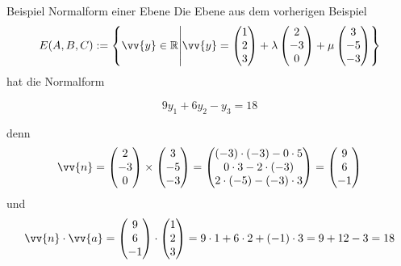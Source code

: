 \begin{frame}{Beispiel Normalform einer Ebene}
	Die Ebene aus dem vorherigen Beispiel
		\[
		E(A,B,C):= \left\{ \vv{y} \in \mathbb{R} \middle| \vv{y} = \begin{pmatrix}
		1\\2\\3
		\end{pmatrix} + \lambda \begin{pmatrix}
		2\\-3\\0
		\end{pmatrix} + \mu \begin{pmatrix}
		3\\-5\\-3
		\end{pmatrix} \right\}
		\]
	hat die Normalform	
	\begin{framed}
	\[
	9 y_1 + 6 y_2 - y_3 = 18
	\]
	\end{framed}
	{\footnotesize
	denn
	\[\vv{n} =
	\begin{pmatrix}
	2\\-3\\0
	\end{pmatrix} \times \begin{pmatrix}
	3\\-5\\-3
	\end{pmatrix} = \begin{pmatrix}
	(-3) \cdot (-3) - 0 \cdot 5 \\ 0 \cdot 3 - 2 \cdot (-3) \\ 2 \cdot (-5) - (-3) \cdot 3
	\end{pmatrix} = \begin{pmatrix}
	9 \\ 6 \\ -1
	\end{pmatrix}
	\]
	und
	\[
	\vv{n} \cdot \vv{a} = \begin{pmatrix}
	9 \\ 6 \\ -1
	\end{pmatrix} \cdot \begin{pmatrix}
	1\\2\\3
	\end{pmatrix} = 9\cdot 1 + 6 \cdot 2 + (-1)\cdot 3= 9 + 12 -3 = 18
	\] }
\end{frame}

